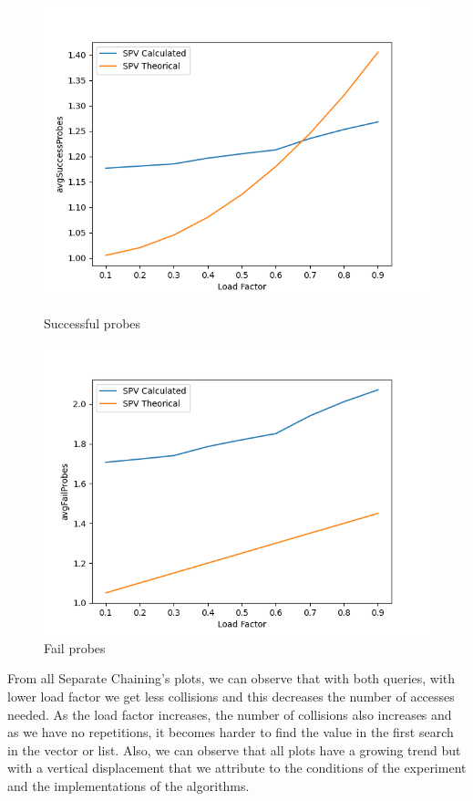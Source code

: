 \documentclass{article}
\begin{document}
        \begin{figure}[!h]
          \includegraphics[width=\linewidth]{images/loadFactor_vs_avgSuccessProbes_SPV.png}
          \caption{Successful probes}\label{fig:plot14}
        \endminipage\hfill
          \includegraphics[width=\linewidth]{images/loadFactor_vs_avgFailProbes_SPV.png}
          \caption{Fail probes}\label{fig:plot15}
        \endminipage
    \end{figure}
    
    From all Separate Chaining's plots, we can observe that with both queries, with lower load factor we get less collisions and this decreases the number of accesses needed. As the load factor increases, the number of collisions also increases and as we have no repetitions, it becomes harder to find the value in the first search in the vector or list. Also, we can observe that all plots have a growing trend but with a vertical displacement that we attribute to the conditions of the experiment and the implementations of the algorithms.
    
\end{document}
